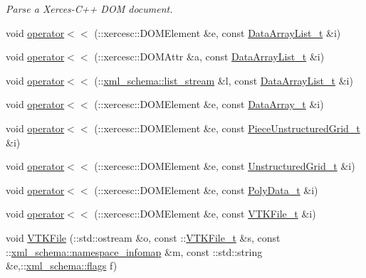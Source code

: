 \begin{DoxyCompactItemize}
\begin{DoxyCompactList}\small\item\em Parse a Xerces-\/\-C++ D\-O\-M document. \end{DoxyCompactList}\item 
void \hyperlink{vtk-unstructured_8cpp_a61ab4b44692dc25fbed88bd01294b3a6}{operator$<$$<$} (\-::xercesc\-::\-D\-O\-M\-Element \&e, const \hyperlink{classDataArrayList__t}{Data\-Array\-List\-\_\-t} \&i)
\item 
void \hyperlink{vtk-unstructured_8cpp_a7630c2ebfb09fec59ec9744ab4de05a1}{operator$<$$<$} (\-::xercesc\-::\-D\-O\-M\-Attr \&a, const \hyperlink{classDataArrayList__t}{Data\-Array\-List\-\_\-t} \&i)
\item 
void \hyperlink{vtk-unstructured_8cpp_a15e37609fa21b26bacce23662c522124}{operator$<$$<$} (\-::\hyperlink{namespacexml__schema_ab6c818ac91e70a25620375e0d000be83}{xml\-\_\-schema\-::list\-\_\-stream} \&l, const \hyperlink{classDataArrayList__t}{Data\-Array\-List\-\_\-t} \&i)
\item 
void \hyperlink{vtk-unstructured_8cpp_a90ac4d883593f3e71cc24b0c8a53f745}{operator$<$$<$} (\-::xercesc\-::\-D\-O\-M\-Element \&e, const \hyperlink{classDataArray__t}{Data\-Array\-\_\-t} \&i)
\item 
void \hyperlink{vtk-unstructured_8cpp_a145ab456a0b4837b55ff6755514fd7d4}{operator$<$$<$} (\-::xercesc\-::\-D\-O\-M\-Element \&e, const \hyperlink{classPieceUnstructuredGrid__t}{Piece\-Unstructured\-Grid\-\_\-t} \&i)
\item 
void \hyperlink{vtk-unstructured_8cpp_a53b72fe6aa7e7f479b37e10e807fe4f4}{operator$<$$<$} (\-::xercesc\-::\-D\-O\-M\-Element \&e, const \hyperlink{classUnstructuredGrid__t}{Unstructured\-Grid\-\_\-t} \&i)
\item 
void \hyperlink{vtk-unstructured_8cpp_abece001f0a506ac3847ede9a0a72d81d}{operator$<$$<$} (\-::xercesc\-::\-D\-O\-M\-Element \&e, const \hyperlink{classPolyData__t}{Poly\-Data\-\_\-t} \&i)
\item 
void \hyperlink{vtk-unstructured_8cpp_ac655f285f1cdc6fc044b7d58a7596a6a}{operator$<$$<$} (\-::xercesc\-::\-D\-O\-M\-Element \&e, const \hyperlink{classVTKFile__t}{V\-T\-K\-File\-\_\-t} \&i)
\item 
void \hyperlink{vtk-unstructured_8cpp_a60fc47cfc610f6c31dfd3b0c12892e49}{V\-T\-K\-File} (\-::std\-::ostream \&o, const \-::\hyperlink{classVTKFile__t}{V\-T\-K\-File\-\_\-t} \&s, const \-::\hyperlink{namespacexml__schema_ad52b6e3505153cb30ba3452f7868450e}{xml\-\_\-schema\-::namespace\-\_\-infomap} \&m, const \-::std\-::string \&e,\-::\hyperlink{namespacexml__schema_a0612287d030cb2732d31a45b258fdc87}{xml\-\_\-schema\-::flags} f)

\end{DoxyCompactItemize}
